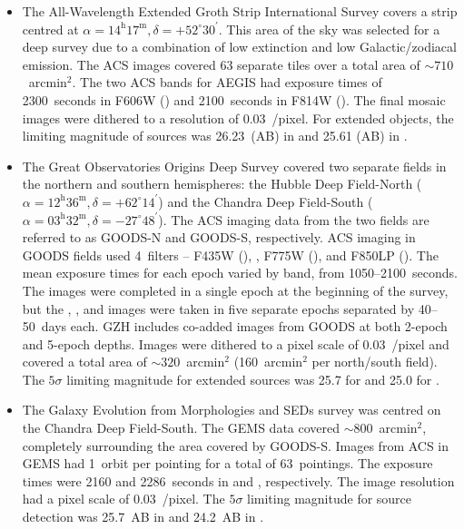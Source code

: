 \documentclass[a4paper,fleqn,usenatbib]{mnras}
\begin{document}
\begin{itemize}

\item The All-Wavelength Extended Groth Strip International Survey
    \citep[AEGIS;][]{dav07} covers a strip centred at
    $\alpha=14^\textrm{h}17^\textrm{m}, \delta=+52^\circ30^\prime$. This area
    of the sky was selected for a deep survey due to a combination of low
    extinction and low Galactic/zodiacal emission. The ACS images covered 63
    separate tiles over a total area of $\sim710$~arcmin$^2$. The two ACS bands
    for AEGIS had exposure times of 2300~seconds in F606W (\Vband) and
    2100~seconds in F814W (\Iband). The final mosaic images were dithered
    to a resolution of 0.03~\arcsec/pixel. For extended objects, the
    limiting magnitude of sources was 26.23~(AB) in \Vband{} and 25.61 (AB) in
    \Iband. 

\item The Great Observatories Origins Deep Survey \citep[GOODS;][]{gia04}
    covered two separate fields in the northern and southern hemispheres: the Hubble
    Deep Field-North ($\alpha=12^\textrm{h}36^\textrm{m},
    \delta=+62^\circ14^\prime$) and the Chandra Deep Field-South
    ($\alpha=03^\textrm{h}32^\textrm{m}, \delta=-27^\circ48^\prime$). The \hst{}
    ACS imaging data from the two fields are referred to as GOODS-N and GOODS-S,
    respectively. ACS imaging in GOODS fields used 4~filters -- F435W (\Bband),
    \Vband, F775W (\iband), and F850LP (\zband). The mean exposure times for each
    epoch varied by band, from 1050--2100~seconds. The \Bband{} images were completed
    in a single epoch at the beginning of the survey, but the \Vband, \iband, and
    \zband{} images were taken in five separate epochs separated by 40--50~days
    each. GZH includes co-added images from GOODS at both 2-epoch and 5-epoch
    depths. Images were dithered to a pixel scale of 0.03~\arcsec/pixel and covered a
    total area of $\sim320$~arcmin$^2$ (160~arcmin$^2$ per north/south field). The
    $5\sigma$ limiting magnitude for extended sources was 25.7 for \Vband{} and
    25.0 for \iband. 

\item The Galaxy Evolution from Morphologies and SEDs
    \citep[GEMS;][]{rix04,cal08} survey was centred on the Chandra Deep
    Field-South. The GEMS data covered $\sim800$~arcmin$^2$, completely surrounding
    the area covered by GOODS-S. Images from ACS in GEMS had 1~orbit per pointing
    for a total of 63~pointings. The exposure times were 2160 and 2286~seconds in
    \Vband{} and \zband{}, respectively. The image resolution had a pixel scale
    of 0.03~\arcsec/pixel. The $5\sigma$ limiting magnitude for source
    detection was 25.7~AB in \Vband{} and 24.2~AB in \zband. 


\end{itemize}
\end{document}
